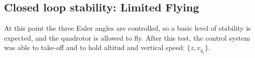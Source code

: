 \documentclass[conference]{IEEEtran}
\newcommand{\refp}[1]{(\ref{#1})}
\begin{document}

\subsection{Closed loop stability: Limited Flying}
\label{sec:results-system-response}
At this point the three Euler angles are controlled, so a basic level of stability is expected, and the quadrotor is allowed to fly. After this test, the control system was able to take-off and to hold altitud and vertical speed: $\{z,v_{q_z}\}$.

\end{document}
